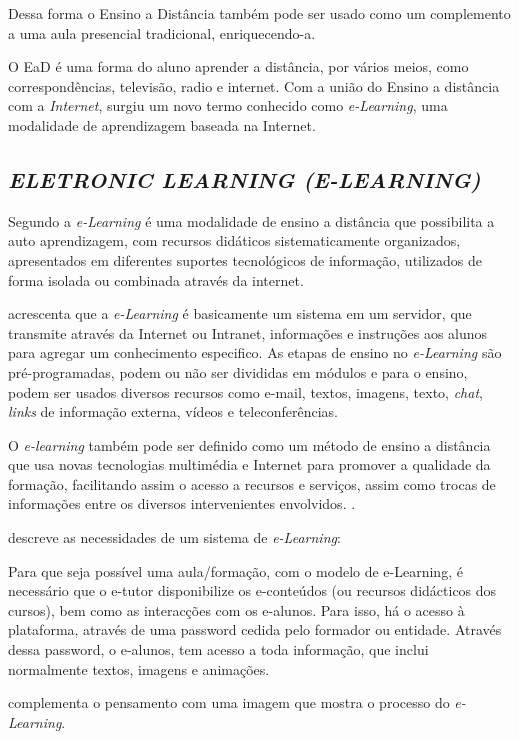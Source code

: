 Dessa forma o Ensino a Distância também pode ser usado como um complemento a uma aula presencial tradicional, enriquecendo-a.

O EaD é uma forma do aluno aprender a distância, por vários meios, como correspondências, televisão, radio e internet. Com a união do Ensino a distância com a \textit{Internet}, surgiu um novo termo conhecido como \textit{e-Learning}, uma modalidade de aprendizagem baseada na Internet.

\newpage
\subsection{\textit{ELETRONIC LEARNING (E-LEARNING)}}
Segundo  a \textit{e-Learning} é uma modalidade de ensino a distância que possibilita a auto aprendizagem, com recursos didáticos sistematicamente organizados, apresentados em diferentes suportes tecnológicos de informação, utilizados de forma isolada ou combinada através da internet.

 acrescenta que a \textit{e-Learning} é basicamente um sistema em um servidor, que transmite através da Internet ou Intranet, informações e instruções aos alunos para agregar um conhecimento especifico. As etapas de ensino no \textit{e-Learning} são pré-programadas, podem ou não ser divididas em módulos e para o ensino, podem ser usados diversos recursos como e-mail, textos, imagens, texto, \textit{chat}, \textit{links} de informação externa, vídeos e teleconferências.

O \textit{e-learning} também pode ser definido como um método de ensino a distância que usa novas tecnologias multimédia e Internet para promover a qualidade da formação, facilitando assim o acesso a recursos e serviços, assim como trocas de informações entre os diversos intervenientes envolvidos. \cite{spi}.

\cite[p.~3]{barbosa} descreve as necessidades de um sistema de \textit{e-Learning}:
\begin{citacao}
  Para que seja possível uma aula/formação, com o modelo de e-Learning, é necessário que o e-tutor disponibilize os e-conteúdos (ou recursos didácticos dos cursos), bem como as interacções com os e-alunos. Para isso, há o acesso à plataforma, através de uma password cedida pelo formador ou entidade. Através dessa password, o e-alunos, tem acesso a toda informação, que inclui normalmente textos, imagens e animações.
\end{citacao}
 complementa o pensamento com uma imagem que mostra o processo do \textit{e-Learning}.

